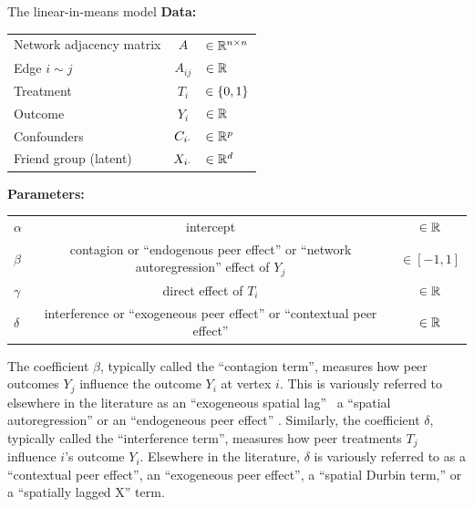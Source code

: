 \documentclass[final]{beamer}
\newlength{\colwidth}
\begin{document}
\begin{frame}[t]
\begin{columns}[t]
\begin{column}{\colwidth}
\begin{block}{The linear-in-means model}
                \textbf{Data:}
                \begin{table}[]
                    \begin{tabular}{lcl}
                        Network adjacency matrix & $A$            & $\in \mathbb{R}^{n \times n}$ \\
                        Edge $i \sim j$          & $A_{ij}$       & $\in \mathbb{R}$              \\
                        Treatment                & $T_i$          & $\in \{0, 1\} $     \\
                        Outcome                  & $Y_i$          & $\in \mathbb{R}$              \\
                        Confounders              & $C_{i \cdot}$ & $\in \mathbb{R}^p$            \\
                        Friend group (latent)    & $X_{i \cdot}$ & $\in \mathbb{R}^d$
                    \end{tabular}
                \end{table}

                \textbf{Parameters:}
                \begin{table}[]
                    \begin{tabular}{lcc}
                        $\alpha$ & intercept                                                                             & $\in \mathbb{R}$      \\
                        $\beta$  & contagion or ``endogenous peer effect'' or ``network autoregression'' effect of $Y_j$ & $\in [-1, 1]$ \\
                        $\gamma$ & direct effect of $T_i$                                                                & $\in \mathbb{R}$      \\
                        $\delta$ & interference or ``exogeneous peer effect'' or ``contextual peer effect''              & $\in \mathbb{R}$
                    \end{tabular}
                \end{table}

                The coefficient $\beta$, typically called the ``contagion term'', measures how peer outcomes $Y_j$ influence the outcome $Y_i$ at vertex $i$.
                This is variously referred to elsewhere in the literature as an ``exogeneous spatial lag'' \, a ``spatial autoregression'' or an ``endogeneous peer effect'' .
                Similarly, the coefficient $\delta$, typically called the ``interference term'', measures how peer treatments $T_j$ influence $i$'s outcome $Y_i$.
                Elsewhere in the literature, $\delta$ is variously referred to as a ``contextual peer effect'', an ``exogeneous peer effect'', a ``spatial Durbin term,'' or a ``spatially lagged X'' term.


\end{block}
\end{column}
\end{columns}
\end{frame}
\end{document}
